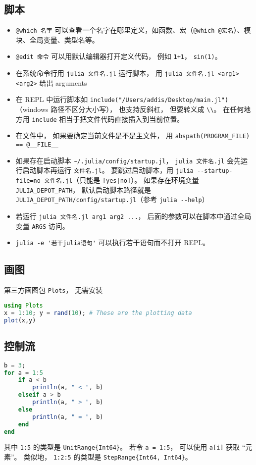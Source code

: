 \subsection{脚本}
\begin{itemize}
\item \verb`@which 名字` 可以查看一个名字在哪里定义，如函数、宏（\verb`@which @宏名`）、模块、全局变量、类型名等。
\item \verb`@edit 命令` 可以用默认编辑器打开定义代码， 例如 \verb`1+1`， \verb`sin(1)`。
\item 在系统命令行用 \verb`julia 文件名.jl` 运行脚本， 用 \verb`julia 文件名.jl <arg1> <arg2>` 给出 arguments
\item 在 REPL 中运行脚本如 \verb`include("/Users/addis/Desktop/main.jl")`（windows 路径不区分大小写）， 也支持反斜杠， 但要转义成 \verb`\\`。 在任何地方用 \verb`include` 相当于把文件代码直接插入到当前位置。
\item 在文件中， 如果要确定当前文件是不是主文件， 用 \verb`abspath(PROGRAM_FILE) == @__FILE__`
\item 如果存在启动脚本 \verb`~/.julia/config/startup.jl`， \verb`julia 文件名.jl` 会先运行启动脚本再运行 \verb`文件名.jl`。 要跳过启动脚本，用 \verb`julia --startup-file=no 文件名.jl`（只能是 \verb`[yes|no]`）。 如果存在环境变量 \verb`JULIA_DEPOT_PATH`， 默认启动脚本路径就是 \verb`JULIA_DEPOT_PATH/config/startup.jl`（参考 \verb`julia --help`）
\item 若运行 \verb`julia 文件名.jl arg1 arg2 ...`， 后面的参数可以在脚本中通过全局变量 \verb`ARGS` 访问。
\item \verb`julia -e '若干julia语句'` 可以执行若干语句而不打开 REPL。
\end{itemize}

\subsection{画图}
第三方画图包 \verb`Plots`， 无需安装
\begin{lstlisting}[language=Julia]
using Plots
x = 1:10; y = rand(10); # These are the plotting data
plot(x,y)
\end{lstlisting}

\subsection{控制流}
\begin{lstlisting}[language=Julia]
b = 3;
for a = 1:5
    if a < b
        println(a, " < ", b)
    elseif a > b
        println(a, " > ", b)
    else
        println(a, " = ", b)
    end
end
\end{lstlisting}
其中 \verb`1:5` 的类型是 \verb`UnitRange{Int64}`。 若令 \verb`a = 1:5`， 可以使用 \verb`a[i]` 获取 “元素”。 类似地， \verb`1:2:5` 的类型是 \verb`StepRange{Int64, Int64}`。

